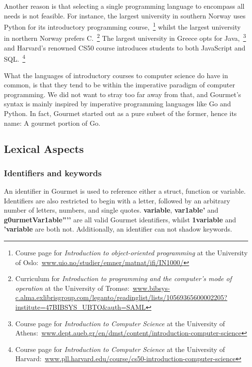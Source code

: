 Another reason is that selecting a single programming language to encompass all needs is not feasible. For instance, the largest university in southern Norway uses Python for its introductory programming course,~\footnote{Course page for \textit{Introduction to object-oriented programming} at the University of Oslo:~\url{www.uio.no/studier/emner/matnat/ifi/IN1000/}} whilst the largest university in northern Norway prefers C.~\footnote{Curriculum for \textit{Introduction to programming and the computer's mode of operation} at the University of Tromsø:~\url{www.bibsys-c.alma.exlibrisgroup.com/leganto/readinglist/lists/10569365600002205?institute=47BIBSYS_UBTO&auth=SAML}} The largest university in Greece opts for Java,~\footnote{Course page for \textit{Introduction to Computer Science} at the University of Athens:~\url{www.dept.aueb.gr/en/dmst/content/introduction-computer-science}} and Harvard's renowned CS50 course introduces students to both JavaScript and SQL.~\footnote{Course page for \textit{Introduction to Computer Science} at the University of Harvard:~\url{www.pll.harvard.edu/course/cs50-introduction-computer-science}} \hfill \\


What the languages of introductory courses to computer science do have in common, is that they tend to be within the imperative paradigm of computer programming. We did not want to stray too far away from that, and Gourmet's syntax is mainly inspired by imperative programming languages like Go and Python. In fact, Gourmet started out as a pure subset of the former, hence its name: A gourmet portion of Go.

\subsection{Lexical Aspects}

\subsubsection{Identifiers and keywords}

An identifier in Gourmet is used to reference either a struct, function or variable. Identifiers are also restricted to begin with a letter, followed by an arbitrary number of letters, numbers, and single quotes. \textbf{variable}, \textbf{var1able’} and \textbf{g0urmetVar1able''’'} are all valid Gourmet identifiers, whilst \textbf{1variable} and \textbf{'variable} are both not. Additionally, an identifier can not shadow keywords. \hfill \\

